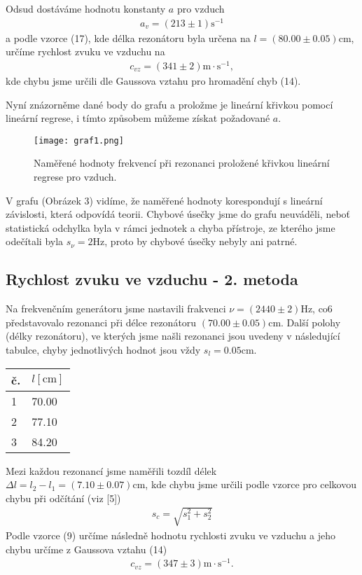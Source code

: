 Odsud dostáváme hodnotu konstanty $a$ pro vzduch
\begin{align*}
        a_{v} = (213 \pm 1) \mathrm{s^{-1}}
\end{align*}
a podle vzorce (17), kde délka rezonátoru byla určena na $l = (80.00 \pm 0.05)\mathrm{cm}$, určíme rychlost zvuku ve vzduchu na
\begin{align*}
    c_{vz} = (341 \pm 2)\mathrm{m\cdot s^{-1}},
\end{align*}
kde chybu jsme určili dle Gaussova vztahu pro hromadění chyb (14). 
\par Nyní znázorněme dané body do grafu a proložme je lineární křivkou pomocí lineární regrese, i tímto způsobem můžeme získat požadované $a$.
\begin{figure}[h]
\centering
\texttt{[image: graf1.png]}
\caption{Naměřené hodnoty frekvencí při rezonanci proložené křivkou lineární regrese pro vzduch.}
\end{figure}
\par V grafu (Obrázek 3) vidíme, že naměřené hodnoty korespondují s lineární závislosti, která odpovídá teorii. Chybové úsečky jsme do grafu neuváděli, neboť statistická odchylka byla v rámci jednotek a chyba přístroje, ze kterého jsme odečítali byla $s_{\nu} = 2 \mathrm{Hz}$, proto by chybové úsečky nebyly ani patrné.

\subsection{Rychlost zvuku ve vzduchu - 2. metoda}
\par Na frekvenčním generátoru jsme nastavili frakvenci $\nu = (2440 \pm 2)\mathrm{Hz}$, co6 představovalo rezonanci při délce rezonátoru $(70.00 \pm 0.05)\mathrm{cm}$. Další polohy (délky rezonátoru), ve kterých jsme našli rezonanci jsou uvedeny v následující tabulce, chyby jednotlivých hodnot jsou vždy $s_l = 0.05 \mathrm{cm}$.
\begin{center}
     \label{tab:title} 
    \begin{tabular}{| l | l |}
    \hline
     č. & $l [\mathrm{cm}]$   \\ \hline
     \hline
    1  & 70.00  \\ \hline
    2  & 77.10 \\ \hline
    3 & 84.20\\ \hline
    \end{tabular}
\end{center}
Mezi každou rezonancí jsme naměřili tozdíl délek $\Delta l=l_2 - l_1 = (7.10 \pm 0.07)\mathrm{cm}$, kde chybu jsme určili podle vzorce pro celkovou chybu při odčítání (viz [5])
\begin{align}
    s_c = \sqrt{s^2_1 + s^2_2}
\end{align}
Podle vzorce (9) určíme následně hodnotu rychlosti zvuku ve vzduchu a jeho chybu určíme z Gaussova vztahu (14)
\begin{align*}
    c_{vz} = (347 \pm 3)\mathrm{m \cdot s^{-1}}.
\end{align*}


